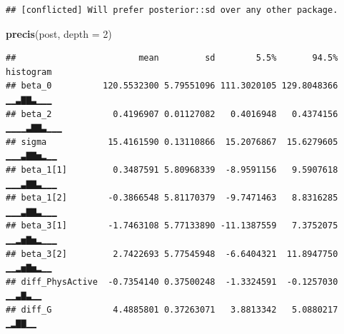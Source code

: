 \documentclass[
]{book}
\newenvironment{Shaded}{\begin{snugshade}}{\end{snugshade}}
\newcommand{\AttributeTok}[1]{\textcolor[rgb]{0.13,0.29,0.53}{#1}}
\newcommand{\CommentTok}[1]{\textcolor[rgb]{0.56,0.35,0.01}{\textit{#1}}}
\newcommand{\DecValTok}[1]{\textcolor[rgb]{0.00,0.00,0.81}{#1}}
\newcommand{\FunctionTok}[1]{\textcolor[rgb]{0.13,0.29,0.53}{\textbf{#1}}}
\newcommand{\NormalTok}[1]{#1}
\newcommand{\OtherTok}[1]{\textcolor[rgb]{0.56,0.35,0.01}{#1}}
\newcommand{\SpecialCharTok}[1]{\textcolor[rgb]{0.81,0.36,0.00}{\textbf{#1}}}
\begin{document}
\begin{Shaded}
\end{Shaded}

\begin{verbatim}
## [conflicted] Will prefer posterior::sd over any other package.
\end{verbatim}

\begin{Shaded}
\begin{Highlighting}[]
\FunctionTok{precis}\NormalTok{(post, }\AttributeTok{depth =} \DecValTok{2}\NormalTok{)}
\end{Highlighting}
\end{Shaded}

\begin{verbatim}
##                        mean         sd        5.5%       94.5%   histogram
## beta_0          120.5532300 5.79551096 111.3020105 129.8048366   ▁▁▃▇▇▃▁▁▁
## beta_2            0.4196907 0.01127082   0.4016948   0.4374156 ▁▁▁▁▃▇▇▃▁▁▁
## sigma            15.4161590 0.13110866  15.2076867  15.6279605  ▁▁▁▃▇▇▅▂▁▁
## beta_1[1]         0.3487591 5.80968339  -8.9591156   9.5907618  ▁▁▁▃▇▇▃▁▁▁
## beta_1[2]        -0.3866548 5.81170379  -9.7471463   8.8316285  ▁▁▁▃▇▇▃▁▁▁
## beta_3[1]        -1.7463108 5.77133890 -11.1387559   7.3752075  ▁▁▂▅▇▅▂▁▁▁
## beta_3[2]         2.7422693 5.77545948  -6.6404321  11.8947750   ▁▁▂▅▇▅▂▁▁
## diff_PhysActive  -0.7354140 0.37500248  -1.3324591  -0.1257030     ▁▁▃▇▃▁▁
## diff_G            4.4885801 0.37263071   3.8813342   5.0880217      ▁▂▇▇▁▁
\end{verbatim}
\end{document}
